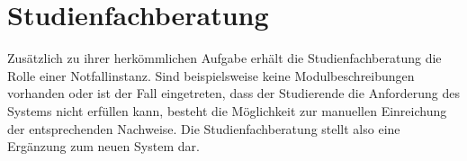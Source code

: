 \section*{Studienfachberatung}

Zusätzlich zu ihrer herkömmlichen Aufgabe erhält die Studienfachberatung die Rolle einer Notfallinstanz. Sind beispielsweise keine Modulbeschreibungen vorhanden oder ist der Fall eingetreten, dass der Studierende die Anforderung des Systems nicht erfüllen kann, besteht die Möglichkeit zur manuellen Einreichung der entsprechenden Nachweise. Die Studienfachberatung stellt also eine Ergänzung zum neuen System dar.